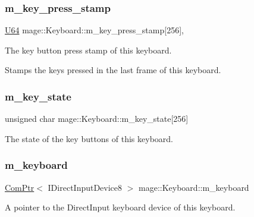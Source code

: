 \subsubsection{\texorpdfstring{m\+\_\+key\+\_\+press\+\_\+stamp}{m\_key\_press\_stamp}}
{\footnotesize\ttfamily \hyperlink{namespacemage_a6672cf3c861707ce4a3235a3eb43941d}{U64} mage\+::\+Keyboard\+::m\+\_\+key\+\_\+press\+\_\+stamp\mbox{[}256\mbox{]}\hspace{0.3cm}{\ttfamily [mutable]}, {\ttfamily [private]}}

The key button press stamp of this keyboard.

Stamps the keys pressed in the last frame of this keyboard. \hypertarget{classmage_1_1_keyboard_a7499df459499f5addd50507ea1e2358c}{}\label{classmage_1_1_keyboard_a7499df459499f5addd50507ea1e2358c} 
\subsubsection{\texorpdfstring{m\+\_\+key\+\_\+state}{m\_key\_state}}
{\footnotesize\ttfamily unsigned char mage\+::\+Keyboard\+::m\+\_\+key\+\_\+state\mbox{[}256\mbox{]}\hspace{0.3cm}{\ttfamily [private]}}

The state of the key buttons of this keyboard. \hypertarget{classmage_1_1_keyboard_a992b8b8caf0d858163e5e9af04302324}{}\label{classmage_1_1_keyboard_a992b8b8caf0d858163e5e9af04302324} 
\subsubsection{\texorpdfstring{m\+\_\+keyboard}{m\_keyboard}}
{\footnotesize\ttfamily \hyperlink{namespacemage_ae74f374780900893caa5555d1031fd79}{Com\+Ptr}$<$ I\+Direct\+Input\+Device8 $>$ mage\+::\+Keyboard\+::m\+\_\+keyboard\hspace{0.3cm}{\ttfamily [private]}}

A pointer to the Direct\+Input keyboard device of this keyboard. \hypertarget{classmage_1_1_keyboard_a075349dbce5145f46146ccdfea78214a}{}\label{classmage_1_1_keyboard_a075349dbce5145f46146ccdfea78214a} 
